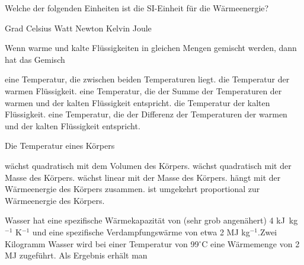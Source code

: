 \documentclass[11pt]{exam}
\begin{document}
\setlength{\voffset}{-0.5in}
\setlength{\headsep}{5pt}

\hspace{2mm}
 \hspace{5mm}
\vspace{4mm}

\begin{questions}

\question Welche der folgenden Einheiten ist die SI-Einheit für die Wärmeenergie?

\begin{choices}
	\choice Grad Celsius
	\choice Watt
	\choice Newton
	\choice Kelvin
	\choice Joule
\end{choices}

\vspace{3mm}\question Wenn warme und kalte Flüssigkeiten in gleichen Mengen gemischt werden, dann hat das Gemisch

\begin{choices}
	\choice eine Temperatur, die zwischen beiden Temperaturen liegt.
	\choice die Temperatur der warmen Flüssigkeit.
	\choice eine Temperatur, die der Summe der Temperaturen der warmen und der kalten Flüssigkeit entspricht.
	\choice die Temperatur der kalten Flüssigkeit.
	\choice eine Temperatur, die der Differenz der Temperaturen der warmen und der kalten Flüssigkeit entspricht.
\end{choices}

\vspace{3mm}\question Die Temperatur eines Körpers

\begin{choices}
	\choice wächst quadratisch mit dem Volumen des Körpers.
	\choice wächst quadratisch mit der Masse des Körpers.
	\choice wächst linear mit der Masse des Körpers.
	\choice hängt mit der Wärmeenergie des Körpers zusammen.
	\choice ist umgekehrt proportional zur Wärmeenergie des Körpers.
\end{choices}

\vspace{3mm}\question Wasser hat eine spezifische Wärmekapazität von (sehr grob angenähert) 4 kJ kg\(^{-1}\) K\(^{-1}\) und eine spezifische Verdampfungswärme von etwa 2 MJ kg\(^{-1}\).Zwei Kilogramm Wasser wird bei einer Temperatur von 99\(^\circ\)C eine Wärmemenge von 2 MJ zugeführt. Als Ergebnis erhält man


\end{questions}
\end{document}
